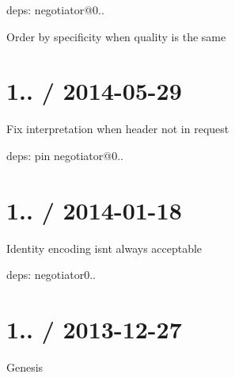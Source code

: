 \begin{DoxyItemize}
\item deps\+: negotiator@0..
\begin{DoxyItemize}
\item Order by specificity when quality is the same
\end{DoxyItemize}
\end{DoxyItemize}

\section*{1.. / 2014-\/05-\/29 }


\begin{DoxyItemize}
\item Fix interpretation when header not in request
\item deps\+: pin negotiator@0..
\end{DoxyItemize}

\section*{1.. / 2014-\/01-\/18 }


\begin{DoxyItemize}
\item Identity encoding isn\textquotesingle{}t always acceptable
\item deps\+: negotiator0..
\end{DoxyItemize}

\section*{1.. / 2013-\/12-\/27 }


\begin{DoxyItemize}
\item Genesis 
\end{DoxyItemize}